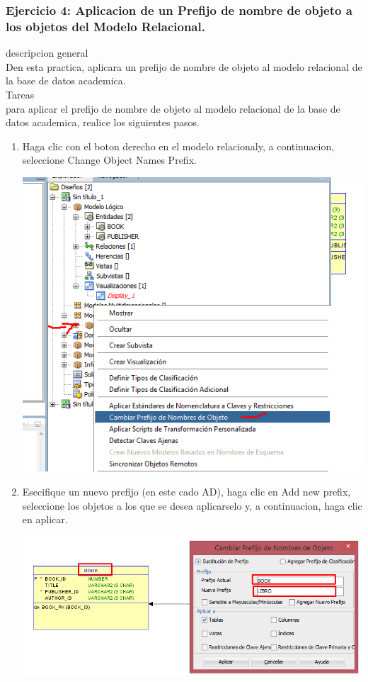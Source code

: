 \documentclass[12pt,letterpaper]{article}
\begin{document}
		\subsubsection{Ejercicio 4: Aplicacion de un Prefijo de nombre de objeto a los objetos del Modelo Relacional.}
		descripcion general  \\
Den esta practica, aplicara un prefijo de nombre de objeto al modelo relacional de la base de datos academica. \\

Tareas\\
para aplicar el prefijo de nombre de objeto al modelo relacional de la base de datos academica, realice los siguientes pasos.  
\begin{enumerate}[1.]
    \item Haga clic con el boton derecho en el modelo relacionaly, a continuacion, seleccione Change Object Names Prefix. 
    
    \includegraphics[width=15cm]{./giselaImagen/imagen9.png} 
    
    \item Esecifique un nuevo prefijo (en este cado AD), haga clic en Add new prefix, seleccione los objetos a los que se desea aplicarselo y, a continuacion, haga clic en aplicar. 
    
    \includegraphics[width=15cm]{./giselaImagen/imagen10.png} 
    

\end{enumerate}
\end{document}
